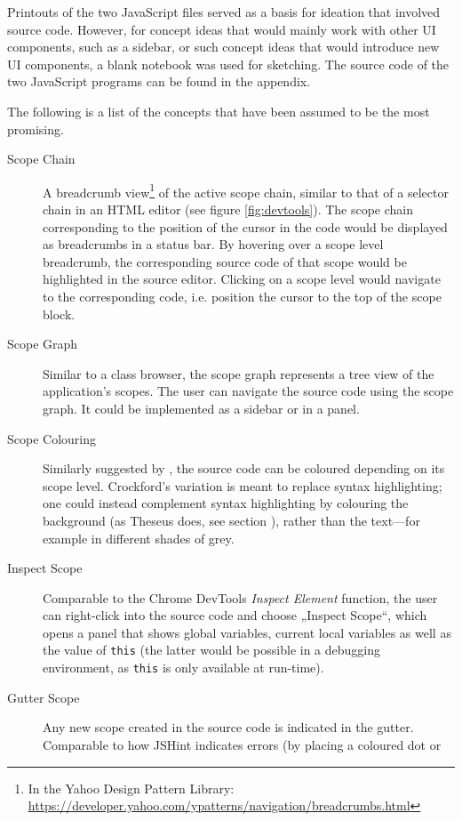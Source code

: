 Printouts of the two JavaScript files served as a basis for ideation
that involved source code. However, for concept ideas that would mainly
work with other UI components, such as a sidebar, or such concept ideas
that would introduce new UI components, a blank notebook was used for
sketching. The source code of the two JavaScript programs can be found
in the appendix.

The following is a list of the concepts that have been assumed to be the
most promising.

\begin{description}
\item[Scope Chain]
A breadcrumb
view\footnote{In the Yahoo Design Pattern Library: \url{https://developer.yahoo.com/ypatterns/navigation/breadcrumbs.html}}
of the active scope chain, similar to that of a selector chain in an
HTML editor (see figure \ref{fig:devtools}). The scope chain
corresponding to the position of the cursor in the code would be
displayed as \gls{breadcrumbs} in a status bar. By hovering over a scope
level breadcrumb, the corresponding source code of that scope would be
highlighted in the source editor. Clicking on a scope level would
navigate to the corresponding code, i.e. position the cursor to the top
of the scope block.
\item[Scope Graph]
Similar to a class browser, the scope graph represents a tree view of
the application’s scopes. The user can navigate the source code using
the scope graph. It could be implemented as a sidebar or in a panel.
\item[Scope Colouring]
Similarly suggested by , the source code can be
coloured depending on its scope level. Crockford’s variation is meant to
replace syntax highlighting; one could instead complement syntax
highlighting by colouring the background (as Theseus does, see section
), rather than the text—for example in different shades
of grey.
\item[Inspect Scope]
Comparable to the Chrome DevTools \emph{Inspect Element} function, the
user can right-click into the source code and choose „Inspect Scope“,
which opens a panel that shows global variables, current local variables
as well as the value of \texttt{this} (the latter would be possible in a
debugging environment, as \texttt{this} is only available at run-time).
\item[Gutter Scope]
Any new scope created in the source code is indicated in the gutter.
Comparable to how JSHint indicates errors (by placing a coloured dot or

\end{description}
